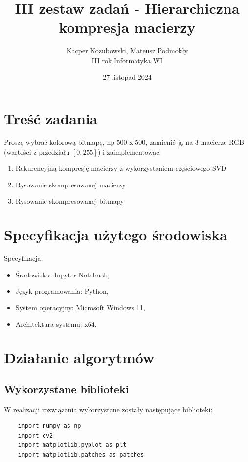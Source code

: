 \documentclass[11pt, leqno]{scrartcl}
\title{III zestaw zadań - Hierarchiczna kompresja macierzy}
\author{Kacper Kozubowski, Mateusz Podmokły \\ III
    rok Informatyka WI}
\date{27 listopad 2024}
\begin{document}
    \maketitle
    \section{Treść zadania}
    Proszę wybrać kolorową bitmapę, np 500 x 500, zamienić ją na
    3 macierze RGB (wartości z przedziału $[0,255]$)
    i zaimplementować:
    \begin{enumerate}
        \item Rekurencyjną kompresję macierzy z wykorzystaniem
            częściowego SVD
        \item Rysowanie skompresowanej macierzy
        \item Rysowanie skompresowanej bitmapy
    \end{enumerate}

    \section{Specyfikacja użytego środowiska}
    Specyfikacja:
    \begin{itemize}
        \item Środowisko: Jupyter Notebook,
        \item Język programowania: Python,
        \item System operacyjny: Microsoft Windows 11,
        \item Architektura systemu: x64.
    \end{itemize}

    \section{Działanie algorytmów}
    \subsection{Wykorzystane biblioteki}
    W realizacji rozwiązania wykorzystane zostały następujące
    biblioteki:
    \begin{lstlisting}
    import numpy as np
    import cv2
    import matplotlib.pyplot as plt
    import matplotlib.patches as patches
    \end{lstlisting}
\end{document}
